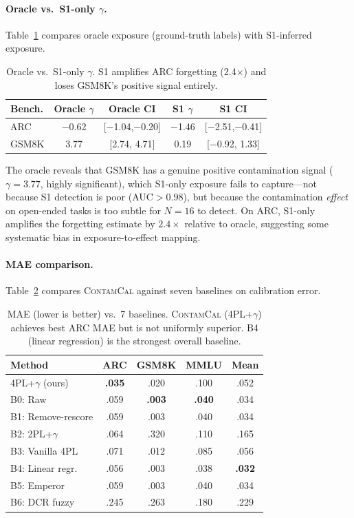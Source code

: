 \documentclass[11pt,a4paper]{article}
\newcommand{\contamcal}{\textsc{ContamCal}}
\begin{document}
\paragraph{Oracle vs.\ S1-only $\gamma$.} Table~\ref{tab:oracle_gamma} compares oracle exposure (ground-truth labels) with S1-inferred exposure.

\begin{table}[t]
\centering
\small
\caption{Oracle vs.\ S1-only $\gamma$. S1 amplifies ARC forgetting (2.4$\times$) and loses GSM8K's positive signal entirely.}
\label{tab:oracle_gamma}
\begin{tabular}{lcccc}
\toprule
Bench. & Oracle $\gamma$ & Oracle CI & S1 $\gamma$ & S1 CI \\
\midrule
ARC & $-$0.62 & [$-$1.04,$-$0.20] & $-$1.46 & [$-$2.51,$-$0.41] \\
GSM8K & 3.77 & [2.74, 4.71] & 0.19 & [$-$0.92, 1.33] \\
\bottomrule
\end{tabular}
\end{table}

The oracle reveals that GSM8K has a genuine positive contamination signal ($\gamma=3.77$, highly significant), which S1-only exposure fails to capture---not because S1 detection is poor (AUC$>$0.98), but because the contamination \emph{effect} on open-ended tasks is too subtle for $N{=}16$ to detect. On ARC, S1-only amplifies the forgetting estimate by $2.4\times$ relative to oracle, suggesting some systematic bias in exposure-to-effect mapping.

\paragraph{MAE comparison.} Table~\ref{tab:mae} compares \contamcal{} against seven baselines on calibration error.

\begin{table}[t]
\centering
\small
\caption{MAE (lower is better) vs.\ 7 baselines. \contamcal{} (4PL+$\gamma$) achieves best ARC MAE but is not uniformly superior. B4 (linear regression) is the strongest overall baseline.}
\label{tab:mae}
\begin{tabular}{lcccc}
\toprule
Method & ARC & GSM8K & MMLU & Mean \\
\midrule
4PL+$\gamma$ (ours) & \textbf{.035} & .020 & .100 & .052 \\
B0: Raw & .059 & \textbf{.003} & \textbf{.040} & .034 \\
B1: Remove-rescore & .059 & .003 & .040 & .034 \\
B2: 2PL+$\gamma$ & .064 & .320 & .110 & .165 \\
B3: Vanilla 4PL & .071 & .012 & .085 & .056 \\
B4: Linear regr. & .056 & .003 & .038 & \textbf{.032} \\
B5: Emperor & .059 & .003 & .040 & .034 \\
B6: DCR fuzzy & .245 & .263 & .180 & .229 \\
\bottomrule
\end{tabular}
\end{table}
\end{document}
